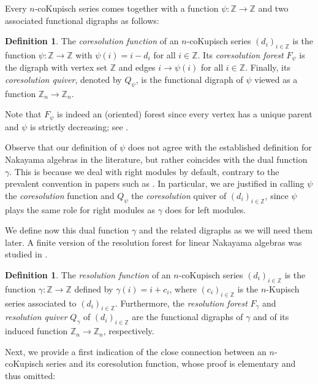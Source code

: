 \documentclass[a4paper]{amsart}
\theoremstyle{definition}
\newtheorem{definition}[theorem]{Definition}
\theoremstyle{remark}
\numberwithin{equation}{theorem}
\newcommand{\Dfn}[1]{\emph{\color{blue}#1}} %
\newcommand{\Z}{\mathbb{Z}}
\newcommand{\psiforest}{F_\psi}
\newcommand{\gammaforest}{F_\gamma}
\newcommand{\psiquiver}{Q_\psi}
\begin{document}
Every $ n $-coKupisch series comes together with a function $ \psi \colon \Z \to \Z $ and two associated functional digraphs as follows:

\begin{definition}\label{dfn:coresolution-forest}
    The \Dfn{coresolution function} of an $ n $-coKupisch series $(d_i)_{i\in\Z}$ is the function $ \psi \colon \Z \to \Z $ with $ \psi(i) = i - d_i $ for all $ i \in \Z $. Its \Dfn{coresolution forest} $ \psiforest $ is the digraph with vertex set $\Z$ and edges
  $i \rightarrow \psi(i)$ for all $i \in \Z$.  Finally, its \Dfn{coresolution quiver}, denoted by $ \psiquiver $, is the functional digraph of $ \psi $ viewed as a function $ \Z_n \to \Z_n $.
\end{definition}

      Note that $\psiforest$ is indeed an (oriented) forest since every vertex has a unique parent and $\psi$ is strictly decreasing; see .

Observe that our definition of $ \psi $ does not agree with the established definition for Nakayama algebras in the literature, but rather coincides with the dual function $ \gamma $. This is because we deal with right modules by default, contrary to the prevalent convention in papers such as \cite{Ma,Ri2,S,S2}. In particular, we are justified in calling $ \psi $ the \emph{coresolution} function and $ Q_\psi $ the \emph{coresolution} quiver of $(d_i)_{i\in\Z}$, since $ \psi $ plays the same role for right modules as $ \gamma $ does for left modules.

We define now this dual function $ \gamma $ and the related digraphs as we will need them later. A finite version of the resolution forest for linear Nakayama algebras was studied in \cite{KMMRS}.

\begin{definition}\label{dfn:resolution-forest}
    The \Dfn{resolution function} of an $ n $-coKupisch series $(d_i)_{i\in\Z}$ is the function $ \gamma \colon \Z \to \Z $ defined by $ \gamma(i) = i + c_i $, where $(c_i)_{i\in\Z}$ is the $ n $-Kupisch series associated to $(d_i)_{i\in\Z}$. Furthermore, the \Dfn{resolution forest} $\gammaforest $ and \Dfn{resolution quiver} $ Q_\gamma $ of $(d_i)_{i\in\Z}$ are the functional digraphs of $ \gamma $ and of its induced function $ \Z_n \to \Z_n $, respectively.
\end{definition}


Next, we provide a first indication of the close connection between an $ n $-coKupisch series and its coresolution function, whose proof is elementary and thus omitted:
\end{document}
